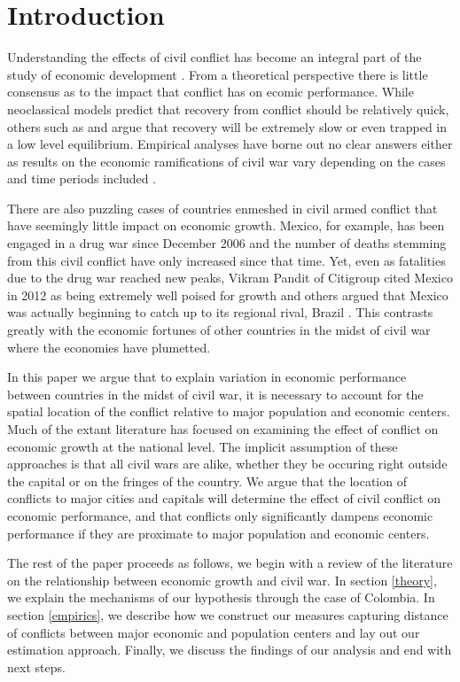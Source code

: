\section{Introduction}
\label{intro}

Understanding the effects of civil conflict has become an integral part of the study of economic development \citep{serneels:verpoorten:2013}. From a theoretical perspective there is little consensus as to the impact that conflict has on ecomic performance. While neoclassical models predict that recovery from conflict should be relatively quick, others such as \citet{barro:martin:2004} and \citet{sachs:2006} argue that recovery will be extremely slow or even trapped in a low level equilibrium. Empirical analyses have borne out no clear answers either as results on the economic ramifications of civil war vary depending on the cases and time periods included \citep{kang:meernik:2005}. 

There are also puzzling cases of countries enmeshed in civil armed conflict that have seemingly little impact on economic growth. Mexico, for example, has been engaged in a drug war since December 2006 and the number of deaths stemming from this civil conflict have only increased since that time. Yet, even as fatalities due to the drug war reached new peaks, Vikram Pandit of Citigroup cited Mexico in 2012 as being extremely well poised for growth and others argued that Mexico was actually beginning to catch up to its regional rival, Brazil \citep{vardi:2012}. This contrasts greatly with the economic fortunes of other countries in the midst of civil war where the economies have plumetted. 

In this paper we argue that to explain variation in economic performance between countries in the midst of civil war, it is necessary to account for the spatial location of the conflict relative to major population and economic centers. Much of the extant literature has focused on examining the effect of conflict on economic growth at the national level. The implicit assumption of these approaches is that all civil wars are alike, whether they be occuring right outside the capital or on the fringes of the country. We argue that the location of conflicts to major cities and capitals will determine the effect of civil conflict on economic performance, and that conflicts only significantly dampens economic performance if they are proximate to major population and economic centers. 

The rest of the paper proceeds as follows, we begin with a review of the literature on the relationship between economic growth and civil war. In section \ref{theory}, we explain the mechanisms of our hypothesis through the case of Colombia. In section \ref{empirics}, we describe how we construct our measures capturing distance of conflicts between major economic and population centers and lay out our estimation approach. Finally, we discuss the findings of our analysis and end with next steps. 